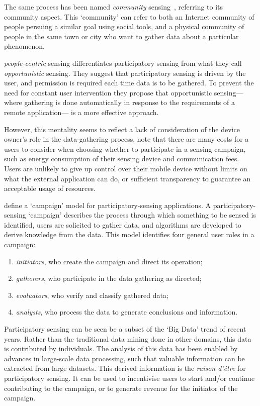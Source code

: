 The same process has been named \emph{community} sensing~\citep{Krause2008},
referring to its community aspect. This `community' can refer to both an
Internet community of people persuing a similar goal using social tools, and a
physical community of people in the same town or city who want to gather data
about a particular phenomenon.

 \emph{people-centric} sensing differentiates
participatory sensing from what they call \emph{opportunistic} sensing. They
suggest that participatory sensing is driven by the user, and permission is
required each time data is to be gathered. To prevent the need for constant
user intervention they propose that opportunistic sensing---where gathering is
done automatically in response to the requirements of a remote application---
is a more effective approach. 

However, this mentality seems to reflect a lack of consideration of the device
owner's role in the data-gathering process. \citet{BuckinghamShum2012} note
that there are many costs for a users to consider when choosing whether to
participate in a sensing campaign, such as energy consumption of their sensing
device and communication fees. Users are unlikely to give up control over
their mobile device without limits on what the external application can do, or
sufficient transparency to guarantee an acceptable usage of resources.

\citet{Burke2006} define a `campaign' model for participatory-sensing
applications. A participatory-sensing `campaign' describes the process through
which something to be sensed is identified, users are solicited to gather
data, and algorithms are developed to derive knowledge from the data. This
model identifies four general user roles in a campaign:

\begin{enumerate}
\item \emph{initiators}, who create the campaign and direct its operation;
\item \emph{gatherers}, who participate in the data gathering as directed;
\item \emph{evaluators}, who verify and classify gathered data;
\item \emph{analysts}, who process the data to generate conclusions and information.
\end{enumerate}

Participatory sensing can be seen be a subset of the `Big Data' trend of
recent years. Rather than the traditional data mining done in other domains,
this data is contributed by individuals. The analysis of this data has been
enabled by advances in large-scale data processing, such that valuable information
can be extracted from large datasets. This derived information is the
\emph{raison d'\^{e}tre} for participatory sensing. It can be used to
incentivise users to start and/or continue contributing to the campaign, or to
generate revenue for the initiator of the campaign.

